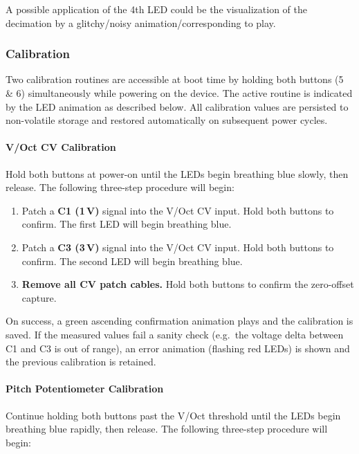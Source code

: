A possible application of the 4th LED could be the visualization of the decimation by a glitchy/noisy animation/corresponding to play.

\subsubsection{Calibration}

Two calibration routines are accessible at boot time by holding both buttons (5 \& 6) simultaneously while powering on the device. 
The active routine is indicated by the LED animation as described below. 
All calibration values are persisted to non-volatile storage and restored automatically on subsequent power cycles.

\paragraph*{V/Oct CV Calibration}

Hold both buttons at power-on until the LEDs begin breathing blue slowly, then release.
The following three-step procedure will begin:

\begin{enumerate}
	\item Patch a \textbf{C1 (1\,V)} signal into the V/Oct CV input. Hold both buttons
	to confirm. The first LED will begin breathing blue.
	\item Patch a \textbf{C3 (3\,V)} signal into the V/Oct CV input. Hold both buttons
	to confirm. The second LED will begin breathing blue.
	\item \textbf{Remove all CV patch cables.} Hold both buttons to confirm the
	zero-offset capture.
\end{enumerate}

On success, a green ascending confirmation animation plays and the calibration is saved. 
If the measured values fail a sanity check (e.g.\ the voltage delta between C1 and C3 is out of range), an error animation (flashing red LEDs) is shown and the previous calibration is retained.

\paragraph*{Pitch Potentiometer Calibration}

Continue holding both buttons past the V/Oct threshold until the LEDs begin breathing blue rapidly, then release. 
The following three-step procedure will begin:

